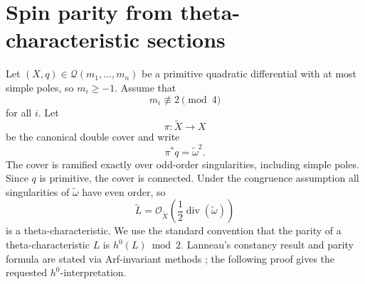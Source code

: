 \documentclass[11pt]{article}
\theoremstyle{remark}
\newcommand{\Xt}{\widetilde X}
\newcommand{\Lt}{\widetilde L}
\newcommand{\wt}{\widetilde\omega}
\newcommand{\OO}{\mathcal O}
\newcommand{\Q}{\mathcal Q}
\DeclareMathOperator{\dv}{div}
\begin{document}
\section{Spin parity from theta-characteristic sections}
Let $(X,q)\in\Q(m_1,\ldots,m_n)$ be a primitive quadratic differential with at most simple poles, so
$m_i\geq -1$. Assume that
\[
m_i\not\equiv 2\pmod 4
\]
for all $i$. Let
\[
\pi:\Xt\longrightarrow X
\]
be the canonical double cover and write
\[
\pi^*q=\wt^2.
\]
The cover is ramified exactly over odd-order singularities, including simple poles. Since $q$ is
primitive, the cover is connected. Under the congruence assumption all singularities of $\wt$ have
even order, so
\[
\Lt=\OO_{\Xt}\left(\frac12\dv(\wt)\right)
\]
is a theta-characteristic. We use the standard convention that the parity of a theta-characteristic
$L$ is $h^0(L)\bmod 2$. Lanneau's constancy result and parity formula are stated via Arf-invariant
methods \cite{Lanneau}; the following proof gives the requested $h^0$-interpretation.
\end{document}

